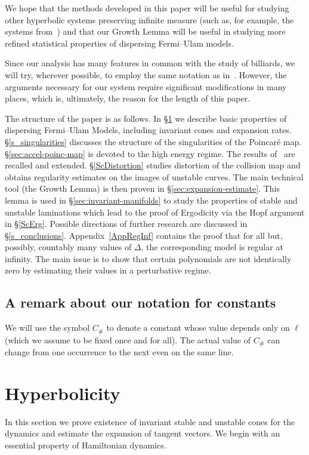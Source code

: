 \documentclass[10pt]{amsart}
\theoremstyle{definition}\newtheorem{defi}[theo]{Definition}\newtheorem{rema}[theo]{Remark}\newtheorem{exam}[theo]{Example}\newtheorem{exem}[theo]{Example}\newtheorem{nota}[theo]{Notation}
\newcommand{\Const}{C_\#}
\begin{document}
We hope that the methods developed in this paper will be useful for studying other hyperbolic systems preserving infinite measure (such as, for example, the systems from~\cite{LY, Zh}) and that our Growth Lemma will be useful in studying more refined statistical properties of dispersing Fermi--Ulam models.

Since our analysis has many features in common with the study of billiards, we will try, wherever possible, to employ the same notation as in~\cite{ChM}. However, the arguments necessary for our system require significant modifications in many places, which is, ultimately, the reason for the length of this paper.

The structure of the paper is as follows. In \S\ref{s_hyperbolicity} we describe basic properties of dispersing Fermi--Ulam Models, including invariant cones and expansion rates. \S\ref{s_singularities} discusses the structure of the singularities of the Poincaré map. \S\ref{sec:accel-poinc-map} is devoted to the high energy regime. The results of~\cite{fum} are recalled and extended. \S\ref{ScDistortion} studies distortion of the collision map and obtains regularity estimates on the images of unstable curves. The main technical tool (the Growth Lemma) is then proven in \S\ref{sec:expansion-estimate}. This lemma is used in \S\ref{sec:invariant-manifolds} to study the properties of stable and unstable laminations which lead to the proof of Ergodicity via the Hopf argument in \S\ref{ScErg}. Possible directions of further research are discussed in \S\ref{s_conclusions}. Appendix~\ref{AppRegInf} contains the proof that for all but, possibly, countably many values of $\Delta$, the corresponding model is regular at infinity. The main issue is to show that certain polynomials are not identically zero by estimating their values in a perturbative regime.


\subsection*{A remark about our notation for constants} 
We will use the symbol $\Const$ to denote a constant whose value depends only on $\ell$ (which we assume to be fixed once and for all). The actual value of $\Const$ can change from one occurrence to the next even on the same line.

\section{Hyperbolicity}\label{s_hyperbolicity}
In this section we prove existence of invariant stable and unstable cones for the dynamics and estimate the expansion of tangent vectors. We begin with an essential property of Hamiltonian dynamics.
\end{document}
